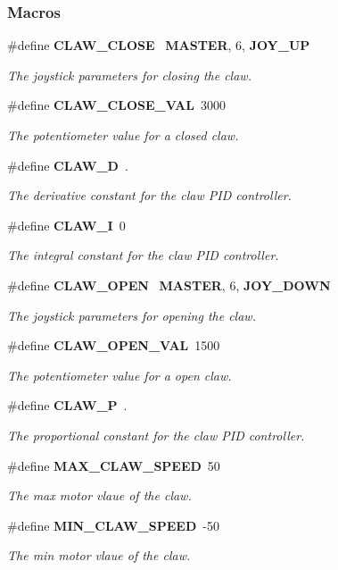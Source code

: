 \subsubsection*{Macros}
\begin{DoxyCompactItemize}
\item 
\#define \textbf{ C\+L\+A\+W\+\_\+\+C\+L\+O\+SE}~\textbf{ M\+A\+S\+T\+ER}, 6, \textbf{ J\+O\+Y\+\_\+\+UP}
\begin{DoxyCompactList}\small\item\em The joystick parameters for closing the claw. \end{DoxyCompactList}\item 
\#define \textbf{ C\+L\+A\+W\+\_\+\+C\+L\+O\+S\+E\+\_\+\+V\+AL}~3000
\begin{DoxyCompactList}\small\item\em The potentiometer value for a closed claw. \end{DoxyCompactList}\item 
\#define \textbf{ C\+L\+A\+W\+\_\+D}~.
\begin{DoxyCompactList}\small\item\em The derivative constant for the claw P\+ID controller. \end{DoxyCompactList}\item 
\#define \textbf{ C\+L\+A\+W\+\_\+I}~0
\begin{DoxyCompactList}\small\item\em The integral constant for the claw P\+ID controller. \end{DoxyCompactList}\item 
\#define \textbf{ C\+L\+A\+W\+\_\+\+O\+P\+EN}~\textbf{ M\+A\+S\+T\+ER}, 6, \textbf{ J\+O\+Y\+\_\+\+D\+O\+WN}
\begin{DoxyCompactList}\small\item\em The joystick parameters for opening the claw. \end{DoxyCompactList}\item 
\#define \textbf{ C\+L\+A\+W\+\_\+\+O\+P\+E\+N\+\_\+\+V\+AL}~1500
\begin{DoxyCompactList}\small\item\em The potentiometer value for a open claw. \end{DoxyCompactList}\item 
\#define \textbf{ C\+L\+A\+W\+\_\+P}~.
\begin{DoxyCompactList}\small\item\em The proportional constant for the claw P\+ID controller. \end{DoxyCompactList}\item 
\#define \textbf{ M\+A\+X\+\_\+\+C\+L\+A\+W\+\_\+\+S\+P\+E\+ED}~50
\begin{DoxyCompactList}\small\item\em The max motor vlaue of the claw. \end{DoxyCompactList}\item 
\#define \textbf{ M\+I\+N\+\_\+\+C\+L\+A\+W\+\_\+\+S\+P\+E\+ED}~-\/50
\begin{DoxyCompactList}\small\item\em The min motor vlaue of the claw. \end{DoxyCompactList}\end{DoxyCompactItemize}
